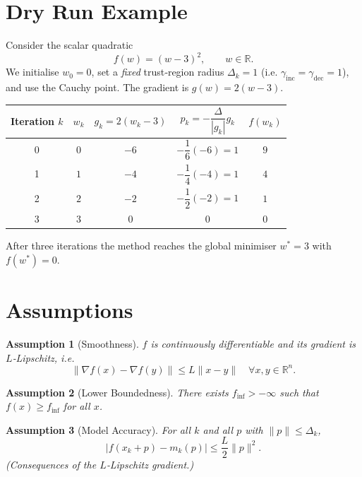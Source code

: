 \documentclass[11pt]{article}
\newtheorem{assumption}{Assumption}[section]
\begin{document}
\section*{Dry Run Example}
Consider the scalar quadratic 
\[
f(w)=(w-3)^{2},\qquad w\in\mathbb{R}.
\]
We initialise $w_{0}=0$, set a \emph{fixed} trust‑region radius $\Delta_{k}=1$ (i.e. $\gamma_{\text{inc}}=\gamma_{\text{dec}}=1$), and use the Cauchy point.  
The gradient is $g(w)=2(w-3)$.

\begin{center}
\begin{tabular}{c|c|c|c|c}
Iteration $k$ & $w_{k}$ & $g_{k}=2(w_{k}-3)$ & $p_{k}= -\dfrac{\Delta}{|g_{k}|}g_{k}$ & $f(w_{k})$\\ \hline
0 & $0$ & $-6$ & $-\dfrac{1}{6}(-6)=1$ & $9$\\
1 & $1$ & $-4$ & $-\dfrac{1}{4}(-4)=1$ & $4$\\
2 & $2$ & $-2$ & $-\dfrac{1}{2}(-2)=1$ & $1$\\
3 & $3$ & $0$  & $0$                         & $0$
\end{tabular}
\end{center}
After three iterations the method reaches the global minimiser $w^{*}=3$ with $f(w^{*})=0$.

\section*{Assumptions}
\begin{assumption}[Smoothness]
\label{as:smooth}
$f$ is continuously differentiable and its gradient is $L$‑Lipschitz, i.e.
\[
\|\nabla f(x)-\nabla f(y)\|\le L\|x-y\|\quad\forall x,y\in\mathbb{R}^{n}.
\]
\end{assumption}

\begin{assumption}[Lower Boundedness]
\label{as:lb}
There exists $f_{\inf}>-\infty$ such that $f(x)\ge f_{\inf}$ for all $x$.
\end{assumption}

\begin{assumption}[Model Accuracy]
\label{as:model}
For all $k$ and all $p$ with $\|p\|\le\Delta_{k}$,
\[
|f(x_{k}+p)-m_{k}(p)|\le \frac{L}{2}\|p\|^{2}.
\]
(Consequences of the $L$‑Lipschitz gradient.)
\end{assumption}
\end{document}
